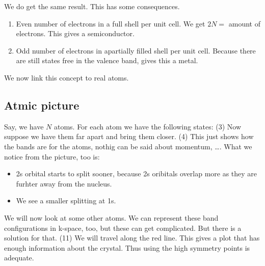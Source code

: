 We do get the same result. This has some consequences.
\begin{enumerate}
	\item Even number of electrons in a full shell per unit cell. We get $2N =$ amount of electrons. This gives a semiconductor.
	\item Odd number of electrons in apartially filled shell per unit cell. Because there are still states free in the valence band, gives this a metal.
\end{enumerate}
We now link this concept to real atoms.
\subsection{Atmic picture}
Say, we have $N$ atoms.
For each atom we have the following states: (3)
Now suppose we have them far apart and bring them closer. (4)
This just shows how the bands are for the atoms, nothig can be said about momentum, \dots. What we notice from the picture, too is:
\begin{itemize}
	\item 2s orbital starts to split sooner, because 2s oribitals overlap more as they are furhter away from the nucleus.
	\item We see a smaller splitting at 1s.
\end{itemize}

We will now look at some other atoms.
We can represent these band configurations in k-space, too, but these can get complicated. But there is a solution for that. (11)
We will travel along the red line. This gives a plot that has enough information about the crystal. Thus using the high symmetry points is adequate.